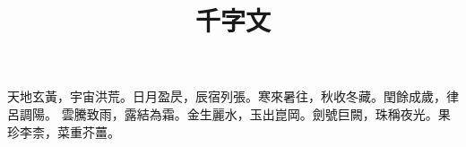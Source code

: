 \documentclass{ltc-tw-vbook}
\title{千字文}
\begin{document}
\begin{正文}
天地玄黃，宇宙洪荒。日月盈昃，辰宿列張。寒來暑往，秋收冬藏。閏餘成歲，律呂調陽。
\newpage
雲騰致雨，露結為霜。金生麗水，玉出崑岡。劍號巨闕，珠稱夜光。果珍李柰，菜重芥薑。
\end{正文}
\end{document}
